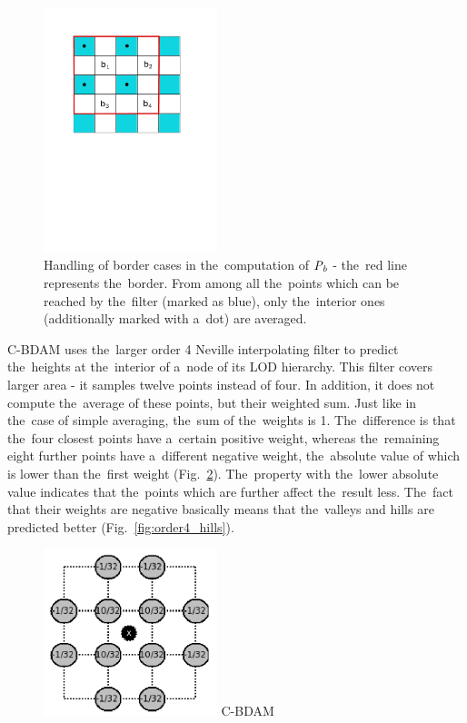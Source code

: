 \begin{figure}
	\includegraphics[trim={1cm 14cm 2cm 0}, clip, width=0.45\textwidth]{figures/bborders.pdf}\centering
	\caption{Handling of border cases in the~computation of $\mathit{P_{b}}$ - the~red line represents the~border. From among all the~points which can be reached by the~filter (marked as blue), only the~interior ones (additionally marked with a~dot) are averaged.}
	\label{fig:bborders}
\end{figure}


C-BDAM uses the~larger order 4 Neville interpolating filter to predict the~heights at the~interior of a~node of its LOD hierarchy. This filter covers larger area - it samples twelve points instead of four. In addition, it does not compute the~average of these points, but their weighted sum. Just like in the~case of simple averaging, the~sum of the~weights is 1. The~difference is that the~four closest points have a~certain positive weight, whereas the~remaining eight further points have a~different negative weight, the~absolute value of which is lower than the~first weight (Fig.~\ref{fig:order4}). The~property with the~lower absolute value indicates that the~points which are further affect the~result less. The~fact that their weights are negative basically means that the~valleys and hills are predicted better (Fig.~\ref{fig:order4_hills}). 

\begin{figure}
	\includegraphics[width=0.45\textwidth]{figures/order4.png}\centering
	{C-BDAM~\cite{cbdam}}
	\label{fig:order4}
\end{figure}

